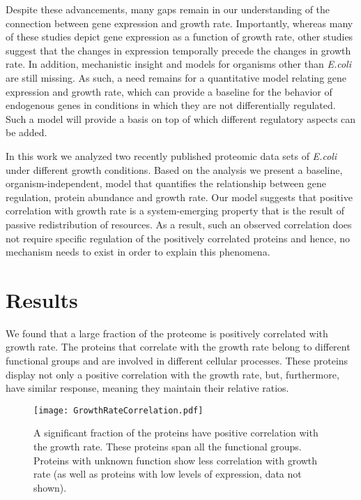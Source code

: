 \documentclass[notitlepage]{article}
\begin{document}
Despite these advancements, many gaps remain in our understanding of the connection between gene expression and growth rate.
Importantly, whereas many of these studies depict gene expression as a function of growth rate, other studies suggest that the changes in expression temporally precede the changes in growth rate\parencite{levy2007}.
In addition, mechanistic insight and models for organisms other than \emph{E.coli} are still missing.
As such, a need remains for a quantitative model relating gene expression and growth rate, which can provide a baseline for the behavior of endogenous genes in conditions in which they are not differentially regulated.
Such a model will provide a basis on top of which different regulatory aspects can be added.

In this work we analyzed two recently published proteomic data sets of \emph{E.coli} under different growth conditions.
Based on the analysis we present a baseline, organism-independent, model that quantifies the relationship between gene regulation, protein abundance and growth rate.
Our model suggests that positive correlation with growth rate is a system-emerging property that is the result of passive redistribution of resources.
As a result, such an observed correlation does not require specific regulation of the positively correlated proteins and hence, no mechanism needs to exist in order to explain this phenomena.

\section{Results}
We found that a large fraction of the proteome is positively correlated with growth rate.
The proteins that correlate with the growth rate belong to different functional groups and are involved in different cellular processes.
These proteins display not only a positive correlation with the growth rate, but, furthermore, have similar response, meaning they maintain their relative ratios.


\begin{figure}[h]
\centering
\texttt{[image: GrowthRateCorrelation.pdf]}
\caption{
A significant fraction of the proteins have positive correlation with the growth rate.
These proteins span all the functional groups.
Proteins with unknown function show less correlation with growth rate (as well as proteins with low levels of expression, data not shown).
}
\label{growth-corr}
\end{figure}
\end{document}
